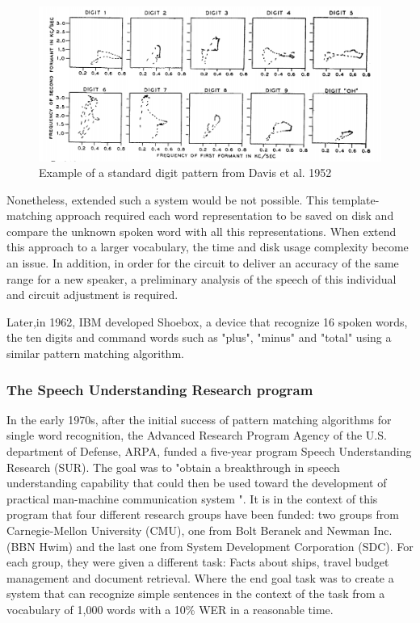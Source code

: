 \begin{figure}[h]
\includegraphics[width=\textwidth]{imgs/bell.png}
\caption{Example of a standard digit pattern from Davis et al. 1952}
\label{Bell}
\end{figure}


Nonetheless, extended such a system would be not possible. This template-matching approach required each word representation to be saved on disk and compare the unknown spoken word with all this representations. When extend this approach to a larger vocabulary, the time and disk usage complexity become an issue. In addition, in order for the circuit to deliver an accuracy of the same range for a new speaker, a preliminary analysis of the speech of this individual and circuit adjustment is required.

Later,in 1962, IBM developed Shoebox, a device that recognize 16 spoken words, the ten digits and command words such as "plus", "minus" and "total" using a similar pattern matching algorithm.

\subsubsection{The Speech Understanding Research program}

In the early 1970s, after the initial success of pattern matching algorithms for single word recognition, the Advanced Research Program Agency of the U.S. department of Defense, ARPA, funded a five-year program Speech Understanding Research (SUR). The goal was to "obtain a breakthrough in speech understanding capability that could then be used toward the development of practical man-machine communication system ". It is in the context of this program that four different research groups have been funded: two groups from Carnegie-Mellon University (CMU), one from Bolt Beranek and Newman Inc. (BBN Hwim) and the last one from System Development Corporation (SDC). For each group, they were given a different task: Facts about ships, travel budget management and document retrieval. Where the  end goal task was to create a system that can recognize simple sentences in the context of the task from a vocabulary of 1,000 words with a 10\% WER in a reasonable time. 

